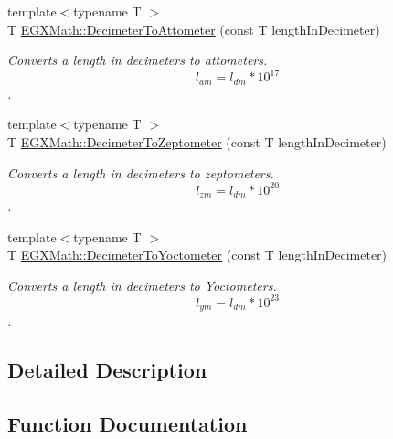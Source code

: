 \begin{DoxyCompactItemize}
{\footnotesize template$<$typename T $>$ }\\T \mbox{\hyperlink{group___e_g_x_math-_conversions-_length_conversions-_decimeter-_s_i_ga9b13c4c4f05e01a1e28293b26b69e01a}{E\+G\+X\+Math\+::\+Decimeter\+To\+Attometer}} (const T length\+In\+Decimeter)
\begin{DoxyCompactList}\small\item\em Converts a length in decimeters to attometers. \[ l_{am}=l_{dm} * 10^{17} \]. \end{DoxyCompactList}\item 
{\footnotesize template$<$typename T $>$ }\\T \mbox{\hyperlink{group___e_g_x_math-_conversions-_length_conversions-_decimeter-_s_i_ga5462e9c56431f0cf1daeafb729eeed24}{E\+G\+X\+Math\+::\+Decimeter\+To\+Zeptometer}} (const T length\+In\+Decimeter)
\begin{DoxyCompactList}\small\item\em Converts a length in decimeters to zeptometers. \[ l_{zm}=l_{dm} * 10^{20} \]. \end{DoxyCompactList}\item 
{\footnotesize template$<$typename T $>$ }\\T \mbox{\hyperlink{group___e_g_x_math-_conversions-_length_conversions-_decimeter-_s_i_ga9da3b12a8bfe244f7af0cc13cf0de4a8}{E\+G\+X\+Math\+::\+Decimeter\+To\+Yoctometer}} (const T length\+In\+Decimeter)
\begin{DoxyCompactList}\small\item\em Converts a length in decimeters to Yoctometers. \[ l_{ym}=l_{dm} * 10^{23} \]. \end{DoxyCompactList}\end{DoxyCompactItemize}


\subsection{Detailed Description}


\subsection{Function Documentation}
\mbox{\label{group___e_g_x_math-_conversions-_length_conversions-_decimeter-_s_i_ga9b13c4c4f05e01a1e28293b26b69e01a}} 
